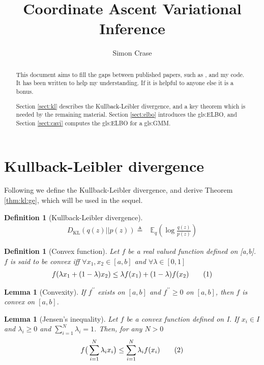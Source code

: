 \documentclass[]{article}
\title{Coordinate Ascent Variational Inference}
\author{Simon Crase}
\newcommand{\Expectation} {\mathbb{E}}
\newcommand{\KLD}[2]{D_{\mathrm{KL}} \left( \left. \left. #1 \right|\right| #2 \right) }
\newcommand\numberthis    {\addtocounter{equation}{1}\tag{\theequation}}
\newtheorem{defn}[thm]{Definition}
\newtheorem{lemma}[thm]{Lemma}
\begin{document}
\maketitle

\begin{abstract}
	This document aims to fill the gaps between published papers, such as \cite{blei2017variational}, and my code\cite{crase2022learn}. It has been written to help my understanding. If it is helpful to anyone else it is a bonus.
	
	Section \ref{sect:kl} describes the Kullback-Leibler divergence, and a key theorem which is needed by the remaining material. Section \ref{sect:elbo} introduces the \gls{gls:ELBO}, and Section \ref{sect:cavi} computes the \gls{gls:ELBO} for a \gls{gls:GMM}.
\end{abstract}

\tableofcontents
\listoftables
\listoftheorems

\section{Kullback-Leibler divergence}\label{sect:kl}

Following \cite{blei2017variational} we define the Kullback-Leibler divergence, and derive Theorem \ref{thm:kl:ge}, which will be used in the sequel.
	
\begin{defn}[Kullback-Leibler divergence]
	\begin{align*}
		\KLD{q(z)}{p(z)} \triangleq& \Expectation_q(\log{\frac{q(z)}{p(z)}}) 
	\end{align*}
\end{defn}

\begin{defn}[Convex function]
	Let $f$ be a real valued function defined on [a,b]. $f$ is said to be convex iff $\forall x_1,x_2 \in [a,b]$ and $\forall \lambda \in [0,1]$
	\begin{align*}
		f(\lambda x_1 + (1-\lambda) x_2) \le \lambda f(x_1) + (1-\lambda)f(x_2) \numberthis \label{eq:convex}
	\end{align*}
\end{defn}

\begin{lemma}[Convexity]\label{lemma:convex}
	If $f^{\prime\prime}$ exists on $[a,b]$ and $f^{\prime\prime}\ge0$ on $[a,b]$, then $f$ is convex on $[a,b]$. 
\end{lemma}

\begin{lemma}[Jensen's inequality]\label{lemma:jensen}
	\cite{rudin1966real}Let $f$ be a convex function defined on I. If $x_i \in I$ and $\lambda_i \ge 0$ and $\sum_{i=1}^{N} \lambda_i=1$. Then, for any $N>0$
	\begin{align*}
		f\big(\sum_{i=1}^{N} \lambda_i x_i\big) \le \sum_{i=1}^{N} \lambda_i f(x_i) \numberthis \label{eq:jensen}
	\end{align*}
\end{lemma}
\end{document}
